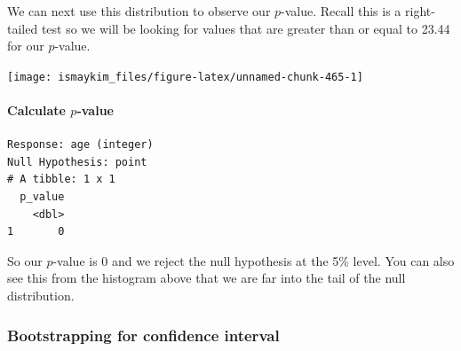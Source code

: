 \documentclass[12pt,]{krantz}
\makeatletter
\newenvironment{Shaded}{\begin{snugshade}}{\end{snugshade}}
\newcommand{\KeywordTok}[1]{\textcolor[rgb]{0.27,0.27,0.27}{\textbf{#1}}}
\newcommand{\DataTypeTok}[1]{\textcolor[rgb]{0.27,0.27,0.27}{#1}}
\newcommand{\StringTok}[1]{\textcolor[rgb]{0.5,0.5,0.5}{#1}}
\newcommand{\OperatorTok}[1]{\textcolor[rgb]{0.43,0.43,0.43}{\textbf{#1}}}
\newcommand{\NormalTok}[1]{#1}
\let\oldparagraph\paragraph
\renewcommand{\paragraph}[1]{\oldparagraph{#1}\mbox{}}
\newenvironment{kframe}{%
\medskip{}
\setlength{\fboxsep}{.8em}
 \def\at@end@of@kframe{}%
 \ifinner\ifhmode%
  \def\at@end@of@kframe{\end{minipage}}%
  \begin{minipage}{\columnwidth}%
 \fi\fi%
 \def\FrameCommand##1{\hskip\@totalleftmargin \hskip-\fboxsep
 \colorbox{shadecolor}{##1}\hskip-\fboxsep
     \hskip-\linewidth \hskip-\@totalleftmargin \hskip\columnwidth}%
 \MakeFramed {\advance\hsize-\width
   \@totalleftmargin\z@ \linewidth\hsize
   \@setminipage}}%
 {\par\unskip\endMakeFramed%
 \at@end@of@kframe}
\renewenvironment{Shaded}{\begin{kframe}}{\end{kframe}}
\theoremstyle{definition}
\theoremstyle{definition}
\theoremstyle{definition}
\theoremstyle{remark}
\makeatother
\begin{document}
We can next use this distribution to observe our \(p\)-value. Recall
this is a right-tailed test so we will be looking for values that are
greater than or equal to 23.44 for our \(p\)-value.

\begin{Shaded}
\end{Shaded}

\begin{center}\texttt{[image: ismaykim\_files/figure-latex/unnamed-chunk-465-1]} \end{center}

\paragraph{\texorpdfstring{Calculate
\(p\)-value}{Calculate p-value}}\label{calculate-p-value}

\begin{Shaded}
\end{Shaded}

\begin{verbatim}
Response: age (integer)
Null Hypothesis: point
# A tibble: 1 x 1
  p_value
    <dbl>
1       0
\end{verbatim}

So our \(p\)-value is 0 and we reject the null hypothesis at the 5\%
level. You can also see this from the histogram above that we are far
into the tail of the null distribution.

\subsubsection*{Bootstrapping for confidence
interval}\label{bootstrapping-for-confidence-interval}
\end{document}
